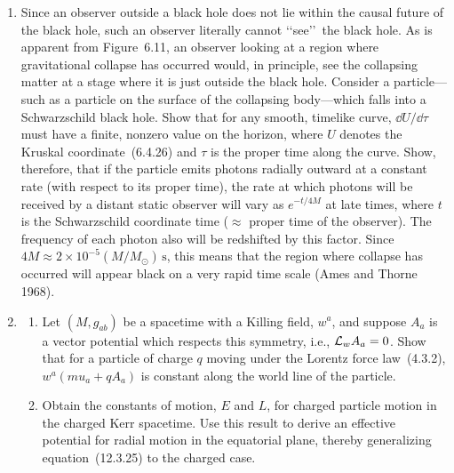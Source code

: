 
\chapterproblems

\begin{enumerate}[label=\arabic*.,leftmargin=2em,itemsep=1.2ex]
\item
Since an observer outside a black hole does not lie within the causal future of the
black hole, such an observer literally cannot \lq\lq see\rq\rq\ the black hole. As is
apparent from Figure~6.11, an observer looking at a region where gravitational
collapse has occurred would, in principle, see the collapsing matter at a stage where
it is just outside the black hole. Consider a particle---such as a particle on the
surface of the collapsing body---which falls into a Schwarzschild black hole. Show
that for any smooth, timelike curve, \(\dd U/\dd\tau\) must have a finite, nonzero
value on the horizon, where \(U\) denotes the Kruskal coordinate~(6.4.26) and
\(\tau\) is the proper time along the curve. Show, therefore, that if the particle emits
photons radially outward at a constant rate (with respect to its proper time), the rate
at which photons will be received by a distant static observer will vary as
\(e^{-t/4M}\) at late times, where \(t\) is the Schwarzschild coordinate time
(\(\approx\) proper time of the observer). The frequency of each photon also will be
redshifted by this factor. Since \(4M\approx2\times10^{-5}(M/M_\odot)\,\mathrm{s}\),
this means that the region where collapse has occurred will appear black on a very
rapid time scale (Ames and Thorne 1968).

\item
\begin{enumerate}[label=\alph*),leftmargin=2em,itemsep=.45ex]
\item Let \((M,g_{ab})\) be a spacetime with a Killing field, \(w^a\), and suppose
\(A_a\) is a vector potential which respects this symmetry, i.e., \(\mathcal{L}_wA_a=0\).
Show that for a particle of charge \(q\) moving under the Lorentz force law~(4.3.2),
\(w^a(mu_a+qA_a)\) is constant along the world line of the particle.
\item Obtain the constants of motion, \(E\) and \(L\), for charged particle motion
in the charged Kerr spacetime. Use this result to derive an effective potential for
radial motion in the equatorial plane, thereby generalizing equation~(12.3.25) to the
charged case.
\end{enumerate}


\end{enumerate}
